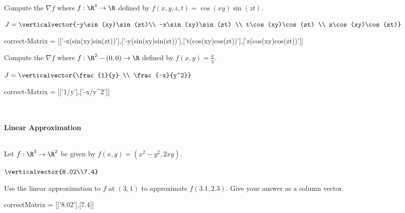 \documentclass{ximera}
\begin{document}
	\begin{question}	
		Compute the $\nabla f$ where $f:\R^4 \to \R$ defined by $f(x,y,z,t) = \cos(xy)\sin(zt)$.
		\begin{solution}
		\begin{hint}
			\(J = \verticalvector{-y\sin(xy)\sin(zt)\\ -x\sin(xy)\sin(zt) \\ t\cos(xy)\cos(zt) \\ z\cos(xy)\cos(zt)}\)
		\end{hint}
		\begin{matrix-answer}[name=J]
			correct-Matrix  = [['-x(sin(xy)sin(zt))'],['-y(sin(xy)sin(zt))'],['t(cos(xy)cos(zt))'],['z(cos(xy)cos(zt))']]
		\end{matrix-answer}
		\end{solution}
	\end{question}
	
	\begin{question}	
		Compute the $\nabla f$ where $f:\R^2-{(0,0)} \to \R$ defined by $f(x,y) = \frac{x}{y}$.
		\begin{solution}
		\begin{hint}
			\(J = \verticalvector{\frac{1}{y} \\ \frac{-x}{y^2}}\)
		\end{hint}
		\begin{matrix-answer}[name=J]
			correct-Matrix  = [['1/y'],['-x/y^2']]
		\end{matrix-answer}
		\end{solution}
	\end{question}
	\\
	\\
	\textbf{Linear Approximation}
	\\
	\\
	\begin{question}
		Let $f:\R^2 \to \R^2$ be given by $f(x,y) = (x^2-y^2,2xy)$.
		\begin{solution}
			\begin{hint}
				$\verticalvector{8.02\\7.4}$
			\end{hint}
			Use the linear approximation to $f$ at $(3,1)$ to approximate $f(3.1,2.3)$.  Give your answer as a column vector.
			\begin{matrix-answer}
				correctMatrix = [['8.02'],[7.4]]
			\end{matrix-answer}
		\end{solution}
	\end{question}
	
\end{document}
